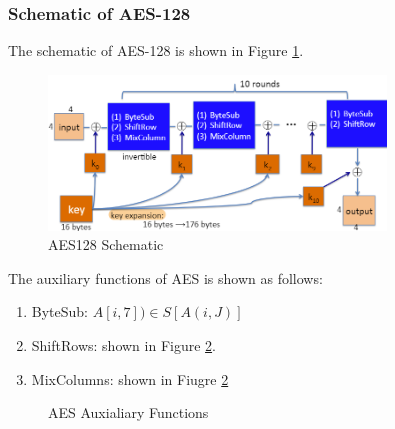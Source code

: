 \subsubsection{Schematic of AES-128}

The schematic of AES-128 is shown in Figure \ref{fig: 03 AES128 Schematic}.

\begin{figure}[h]
    \centering
    \includegraphics[width=0.8\textwidth]{Stanford_Crypto_1/fig/03_block_cipher/AES128 Schematic.png}
    \caption{AES128 Schematic}
    \label{fig: 03 AES128 Schematic}
\end{figure}

The auxiliary functions of AES is shown as follows:

\begin{enumerate}
    \item ByteSub: $A[i, 7]) \in S[A(i, J)]$
    \item ShiftRows: shown in Figure \ref{fig: 03 AES Auxialiary Functions}.
    \item MixColumns: shown in Fiugre \ref{fig: 03 AES Auxialiary Functions}
\end{enumerate}

\begin{figure}[h]
    \caption{AES Auxialiary Functions}
    \label{fig: 03 AES Auxialiary Functions}
    
\end{figure}


